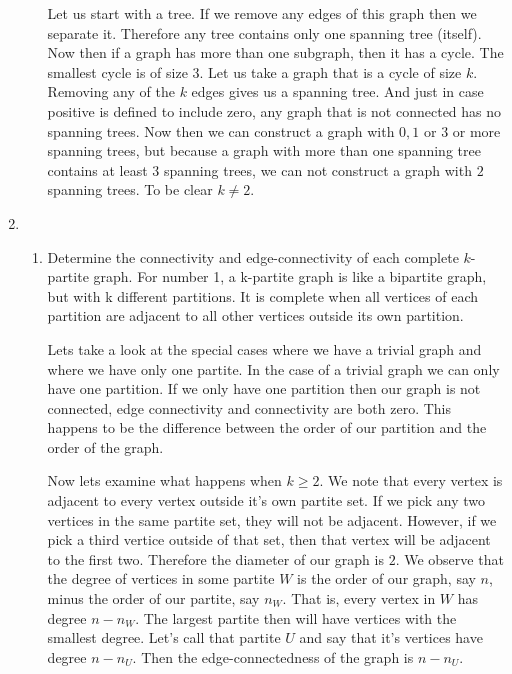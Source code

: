 \documentclass[letterpaper]{article}
\begin{document}
\begin{enumerate}
\begin{enumerate}
  Let us start with a tree. If we remove any edges of this graph then we separate it. Therefore any tree contains only one spanning tree (itself). Now then if a graph has more than one subgraph, then it has a cycle. The smallest cycle is of size $3$. Let us take a graph that is a cycle of size $k$. Removing any of the $k$ edges gives us a spanning tree. And just in case positive is defined to include zero, any graph that is not connected has no spanning trees. Now then we can construct a graph with $0, 1$ or $3$ or more spanning trees, but because a graph with more than one spanning tree contains at least $3$ spanning trees, we can not construct a graph with $2$ spanning trees. To be clear $k\ne 2$.
\end{enumerate}
\item
\begin{enumerate}
  \item
  Determine the connectivity and edge-connectivity of each complete $k$-partite graph.
  For number 1, a k-partite graph is like a bipartite graph, but with k different partitions.  It is complete when all vertices of each partition are adjacent to all other vertices outside its own partition.

  Lets take a look at the special cases where we have a trivial graph and where we have only one partite. In the case of a trivial graph we can only have one partition. If we only have one partition then our graph is not connected, edge connectivity and connectivity are both zero. This happens to be the difference between the order of our partition and the order of the graph.

  Now lets examine what happens when $k\ge 2$. We note that every vertex is adjacent to every vertex outside it's own partite set. If we pick any two vertices in the same partite set, they will not be adjacent. However, if we pick a third vertice outside of that set, then that vertex will be adjacent to the first two. Therefore the diameter of our graph is $2$. We observe that the degree of vertices in some partite $W$ is the order of our graph, say $n$, minus the order of our partite, say $n_W$. That is, every vertex in $W$ has degree $n-n_W$. The largest partite then will have vertices with the smallest degree. Let's call that partite $U$ and say that it's vertices have degree $n-n_U$. Then the edge-connectedness of the graph is $n-n_U$.


\end{enumerate}
\end{enumerate}
\end{document}
